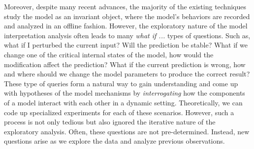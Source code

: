 Moreover, despite many recent advances, the majority of the existing techniques study the model as an invariant object, where the model's behaviors are recorded and analyzed in an offline fashion.
%
However, the exploratory nature of the model interpretation analysis often leads to many \emph{what if ...} types of questions. Such as, what if I perturbed the current input? Will the prediction be stable? What if we change one of the critical internal states of the model, how would the modification affect the prediction? What if the current prediction is wrong, how and where should we change the model parameters to produce the correct result? These type of queries form a natural way to gain understanding and come up with hypotheses of the model mechanisms by \emph{interrogating} how the components of a model interact with each other in a dynamic setting. Theoretically, we can code up specialized experiments for each of these scenarios. However, such a process is not only tedious but also ignored the iterative nature of the exploratory analysis. Often, these questions are not pre-determined. Instead, new questions arise as we explore the data and analyze previous observations.

